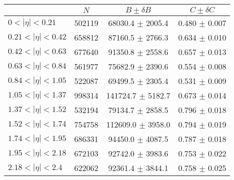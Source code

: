 \begin{tabular}{lccc}
\hline
    &   $N$   & $B \pm \delta B$  &  $C \pm \delta C$ \\
\hline
$0 < |\eta| <0.21$             & 502119     & 68030.4    $\pm$ 2005.4 & 0.480      $\pm$ 0.007 \\
$0.21 < |\eta| <0.42$          & 658812     & 87160.5    $\pm$ 2766.3 & 0.634      $\pm$ 0.010 \\
$0.42 < |\eta| <0.63$          & 677640     & 91350.8    $\pm$ 2558.6 & 0.657      $\pm$ 0.013 \\
$0.63 < |\eta| <0.84$          & 561977     & 75682.9    $\pm$ 2390.6 & 0.554      $\pm$ 0.008 \\
$0.84 < |\eta| <1.05$          & 522087     & 69499.5    $\pm$ 2305.4 & 0.531      $\pm$ 0.009 \\
$1.05 < |\eta| <1.37$          & 998314     & 141724.7   $\pm$ 5182.7 & 0.673      $\pm$ 0.014 \\
$1.37 < |\eta| <1.52$          & 532194     & 79134.7    $\pm$ 2858.5 & 0.796      $\pm$ 0.018 \\
$1.52 < |\eta| <1.74$          & 754758     & 112609.0   $\pm$ 3958.0 & 0.794      $\pm$ 0.019 \\
$1.74 < |\eta| <1.95$          & 686331     & 94450.0    $\pm$ 4087.5 & 0.787      $\pm$ 0.018 \\
$1.95 < |\eta| <2.18$          & 672103     & 92742.0    $\pm$ 3983.6 & 0.753      $\pm$ 0.022 \\
$2.18 < |\eta| <2.4$           & 622062     & 92361.4    $\pm$ 3844.1 & 0.758      $\pm$ 0.025 \\
\hline
\end{tabular}
